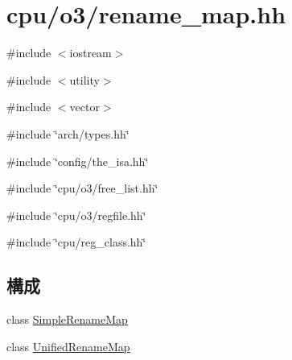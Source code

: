 \hypertarget{rename__map_8hh}{
\section{cpu/o3/rename\_\-map.hh}
\label{rename__map_8hh}
}
{\ttfamily \#include $<$iostream$>$}\par
{\ttfamily \#include $<$utility$>$}\par
{\ttfamily \#include $<$vector$>$}\par
{\ttfamily \#include \char`\"{}arch/types.hh\char`\"{}}\par
{\ttfamily \#include \char`\"{}config/the\_\-isa.hh\char`\"{}}\par
{\ttfamily \#include \char`\"{}cpu/o3/free\_\-list.hh\char`\"{}}\par
{\ttfamily \#include \char`\"{}cpu/o3/regfile.hh\char`\"{}}\par
{\ttfamily \#include \char`\"{}cpu/reg\_\-class.hh\char`\"{}}\par
\subsection*{構成}
\begin{DoxyCompactItemize}
\item 
class \hyperlink{classSimpleRenameMap}{SimpleRenameMap}
\item 
class \hyperlink{classUnifiedRenameMap}{UnifiedRenameMap}
\end{DoxyCompactItemize}
